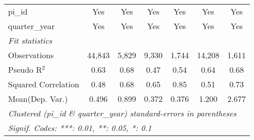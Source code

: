 \begin{tabular}{lcccccc}
   pi\_id                                                     & Yes           & Yes           & Yes           & Yes           & Yes           & Yes\\  
   quarter\_year                                              & Yes           & Yes           & Yes           & Yes           & Yes           & Yes\\  
   \midrule
   \emph{Fit statistics}\\
   Observations                                               & 44,843        & 5,829         & 9,330         & 1,744         & 14,208        & 1,611\\  
   Pseudo R$^2$                                               & 0.63          & 0.68          & 0.47          & 0.54          & 0.64          & 0.68\\  
   Squared Correlation                                        & 0.48          & 0.68          & 0.65          & 0.85          & 0.51          & 0.73\\  
Mean(Dep. Var.) & 0.496 & 0.899 & 0.372 & 0.376 & 1.200 & 2.677 \\
   \midrule \midrule
   \multicolumn{7}{l}{\emph{Clustered (pi\_id \& quarter\_year) standard-errors in parentheses}}\\
   \multicolumn{7}{l}{\emph{Signif. Codes: ***: 0.01, **: 0.05, *: 0.1}}\\
\end{tabular}
\par\endgroup
